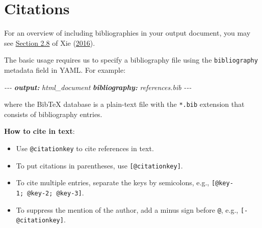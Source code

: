 \documentclass[
  a4paper,
  twoside,
  openright]{book}
\newenvironment{Shaded}{\begin{snugshade}}{\end{snugshade}}
\newcommand{\AnnotationTok}[1]{\textcolor[rgb]{0.56,0.35,0.01}{\textbf{\textit{#1}}}}
\newcommand{\CommentTok}[1]{\textcolor[rgb]{0.56,0.35,0.01}{\textit{#1}}}
\theoremstyle{definition}
\theoremstyle{definition}
\theoremstyle{definition}
\theoremstyle{definition}
\theoremstyle{remark}
\begin{document}
\section{Citations}\label{citations}

For an overview of including bibliographies in your output document, you may see \href{https://bookdown.org/yihui/bookdown/citations.html}{Section 2.8} of Xie (\href{https://bookdown.org/yihui/rmarkdown-cookbook/bibliography.html\#ref-bookdown2016}{2016}).

The basic usage requires us to specify a bibliography file using the \texttt{bibliography} metadata field in YAML. For example:

\begin{Shaded}
\begin{Highlighting}[]
\CommentTok{{-}{-}{-}}
\AnnotationTok{output:}\CommentTok{ html\_document}
\AnnotationTok{bibliography:}\CommentTok{ references.bib  }
\CommentTok{{-}{-}{-}}
\end{Highlighting}
\end{Shaded}

where the BibTeX database is a plain-text file with the \texttt{*.bib} extension that consists of bibliography entries.

\textbf{How to cite in text}:

\begin{itemize}
\item
  Use \texttt{@citationkey} to cite references in text.
\item
  To put citations in parentheses, use \texttt{{[}@citationkey{]}}.
\item
  To cite multiple entries, separate the keys by semicolons, e.g., \texttt{{[}@key-1;\ @key-2;\ @key-3{]}}.
\item
  To suppress the mention of the author, add a minus sign before \texttt{@}, e.g., \texttt{{[}-@citationkey{]}}.
\end{itemize}
\end{document}
